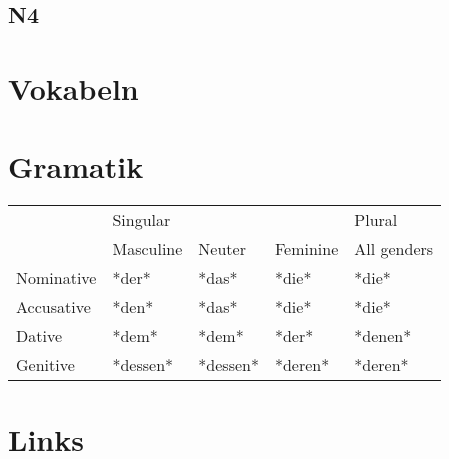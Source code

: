 \documentclass[justified, a4paper, notitlepage, captions=tableheading, nobib]{tufte-handout}
\begin{document}
\subsection{N4}
\label{sec:orgd055184}

\section{Vokabeln}
\label{sec:org7951571}


\section{Gramatik}
\label{sec:org1a42a68}

\begin{tabular}{|l|l|l|l|l|}
\hline
 & \multicolumn{3}{l|}{Singular} & Plural \\
\cline{2-5}
 & Masculine & Neuter & Feminine & All genders \\
\hline
Nominative & *der* & *das* & *die* & *die* \\
Accusative & *den* & *das* & *die* & *die* \\
Dative & *dem* & *dem* & *der* & *denen* \\
Genitive & *dessen* & *dessen* & *deren* & *deren* \\
\hline
\end{tabular}

\section{Links}
\label{sec:org52dfce8}
\end{document}
